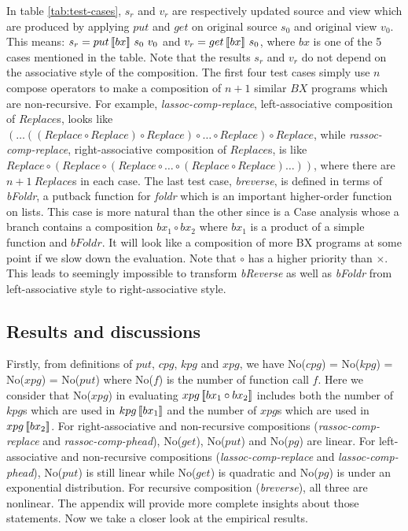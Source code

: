 In table \ref{tab:test-cases}, $s_r$ and $v_r$ are respectively updated source and view which are produced by applying $put$ and $get$ on original source $s_0$ and original view $v_0$. This means: $s_r = put \, [\![bx]\!] \ s_0 \ v_0$ and $v_r = get \, [\![bx]\!] \ s_0$, where $bx$ is one of the 5 cases mentioned in the table. Note that the results $s_r$ and $v_r$ do not depend on the associative style of the composition. The first four test cases simply use $n$ compose operators to make a composition of $n + 1$ similar $BX$ programs which are non-recursive. For example, \textit{lassoc-comp-replace}, left-associative composition of $Replace$s, looks like $(\ldots((Replace \circ Replace) \circ Replace) \circ \ldots \circ Replace) \circ Replace$, while \textit{rassoc-comp-replace}, right-associative composition of $Replace$s, is like $Replace \circ (Replace \circ (Replace \circ \ldots \circ (Replace \circ Replace)\ldots))$, where there are $n + 1 \ Replace$s in each case. The last test case, \textit{breverse}, is defined in terms of \textit{bFoldr}, a putback function for \textit{foldr} which is an important higher-order function on lists. This case is more natural than the other since  is a Case analysis whose a branch contains a composition $bx_1 \circ bx_2$ where $bx_1$ is a product of a simple function and $bFoldr$. It will look like a composition of more BX programs at some point if we slow down the evaluation. Note that $\circ$ has a higher priority than $\times$. This leads to seemingly impossible to transform \textit{bReverse} as well as \textit{bFoldr} from left-associative style to right-associative style.

\subsection{Results and discussions}

Firstly, from definitions of $put$, $cpg$, $kpg$ and $xpg$, we have No($cpg$) = No($kpg$) = No($xpg$) = No($put$) where No($f$) is the number of function call $f$. Here we consider that No($xpg$) in evaluating $xpg \, [\![bx_1 \circ bx_2]\!]$ includes both the number of $kpg$s which are used in $kpg \, [\![bx_1]\!]$ and the number of $xpg$s which are used in $xpg \, [\![bx_2]\!]$. For right-associative and non-recursive compositions (\textit{rassoc-comp-replace} and \textit{rassoc-comp-phead}), No($get$), No($put$) and No($pg$) are linear. For left-associative and non-recursive compositions (\textit{lassoc-comp-replace} and \textit{lassoc-comp-phead}), No($put$) is still linear while No($get$) is quadratic and No($pg$) is under an exponential distribution. For recursive composition (\textit{breverse}), all three are nonlinear. The appendix will provide more complete insights about those statements. Now we take a closer look at the empirical results.

